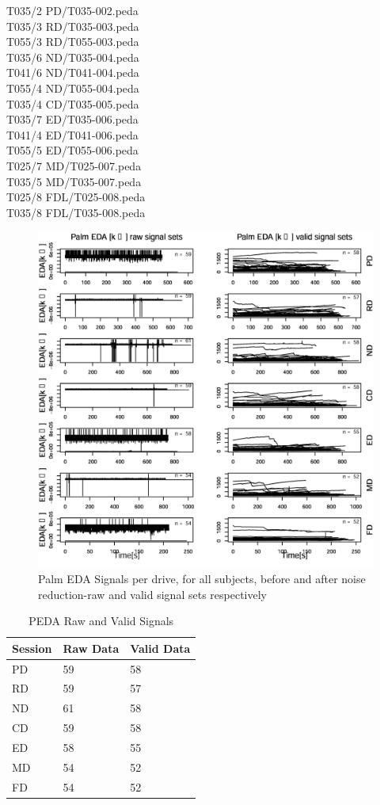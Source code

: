 \documentclass[a4paper]{article}
\begin{document}
T035/2 PD/T035-002.peda\\
T035/3 RD/T035-003.peda\\
T055/3 RD/T055-003.peda\\
T035/6 ND/T035-004.peda\\
T041/6 ND/T041-004.peda\\
T055/4 ND/T055-004.peda\\
T035/4 CD/T035-005.peda\\
T035/7 ED/T035-006.peda\\
T041/4 ED/T041-006.peda\\
T055/5 ED/T055-006.peda\\
T025/7 MD/T025-007.peda\\
T035/5 MD/T035-007.peda\\
T025/8 FDL/T025-008.peda\\
T035/8 FDL/T035-008.peda\\

\begin{figure}[h]
\centering
\includegraphics[width=1.0\textwidth]{peda.jpg}
\caption{\label{fig:peda}Palm EDA Signals per drive, for all subjects, before and after noise reduction-raw and valid signal sets respectively}
\end{figure}

 \begin{table}[!h]
 \centering
 \begin{tabular}{l|l|l}
Session & Raw Data & Valid Data \\\hline
 PD & 59 & 58\\
RD & 59 & 57\\
ND & 61 & 58 \\
CD & 59 & 58 \\
ED & 58 & 55 \\
MD & 54 & 52 \\
FD & 54 & 52 
 \end{tabular}
\caption{\label{tab:peda}PEDA Raw and Valid Signals}
\end{table}
\end{document}

